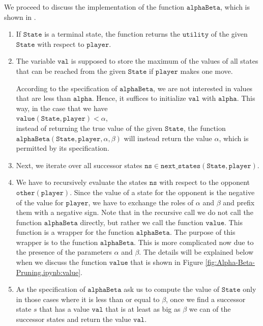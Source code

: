 \noindent
We proceed to discuss the implementation of the function $\texttt{alphaBeta}$, which is shown in
.
\begin{enumerate}
\item If $\texttt{State}$ is a terminal state, the function returns the $\texttt{utility}$ of the given
      $\texttt{State}$ with respect to $\texttt{player}$.
\item The variable $\texttt{val}$ is supposed to store the maximum of the values of all states
      that can be reached from the given $\texttt{State}$ if $\texttt{player}$ makes one move.
      
      According to the specification of $\texttt{alphaBeta}$,  we are not interested in values that are less than
      $\texttt{alpha}$.  Hence, it suffices to initialize $\texttt{val}$ with $\texttt{alpha}$.   This way, in the case that we have
      \\[0.2cm]
      \hspace*{1.3cm}
      $\texttt{value}(\texttt{State},\texttt{player}) < \alpha$,
      \\[0.2cm]
      instead of returning the true value of the given $\texttt{State}$, the function
      $\texttt{alphaBeta}(\texttt{State},\texttt{player},\alpha,\beta)$ will instead return the value $\alpha$, which is permitted by its specification.
\item Next, we iterate over all successor states $\texttt{ns} \in \texttt{next\_states}(\texttt{State}, \texttt{player})$.
\item We have to recursively evaluate the states $\texttt{ns}$ with respect to the opponent  $\texttt{other}(\texttt{player})$.
      Since the value of a state for the opponent is the negative of the value for
      $\texttt{player}$, we have to exchange the roles of $\alpha$ and $\beta$ and prefix them with a negative
      sign.  Note that in the recursive call we do not call the function $\mathtt{alphaBeta}$ directly, but
      rather we call the function $\mathtt{value}$.  This function is a wrapper for the function
      $\mathtt{alphaBeta}$.  The purpose of this wrapper is to  the function
      $\mathtt{alphaBeta}$.  This is more complicated now due to the presence of the parameters $\alpha$ and $\beta$.
      The details will be explained below when we discuss the function $\texttt{value}$ that is shown in Figure
      \ref{fig:Alpha-Beta-Pruning.ipynb:value}.
\item As the specification of $\texttt{alphaBeta}$ ask us to compute the value of $\texttt{State}$ only in
      those cases where it is less than or equal to $\beta$, once we find a successor state $s$ that has a
      value $\texttt{val}$ that is at least as big as $\beta$ we can  of the successor
      states and return the value $\texttt{val}$.


\end{enumerate}
